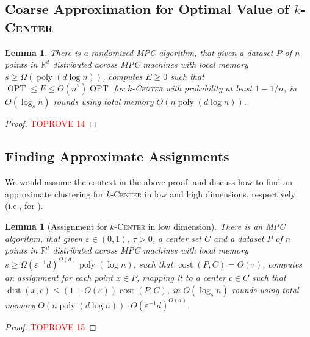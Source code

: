 \documentclass[11pt,letterpaper]{article}
\theoremstyle{plain}
\newtheorem{lemma}[theorem]{Lemma}
\theoremstyle{definition}
\theoremstyle{remark}
\newcommand{\ProblemName}[1]{\textsc{#1}}
\newcommand{\kCenter}{$k$-\ProblemName{Center}\xspace}
\DeclareMathOperator{\poly}{poly}
\DeclareMathOperator{\cost}{cost}
\DeclareMathOperator{\OPT}{OPT}
\DeclareMathOperator{\dist}{dist}
\begin{document}
\subsection{Coarse Approximation for Optimal Value of \kCenter}
\label{subsec:guess}
\begin{lemma}
    \label{lemma:guess_OPT}
    There is a randomized MPC algorithm, that given a dataset $P$ of $n$ points in $\mathbb{R}^{d}$ distributed across MPC machines with local memory $s\geq \Omega(\poly(d\log n))$,
    computes $E \geq 0$ such that $\OPT \leq E \leq O(n^7) \OPT$ for \kCenter
    with probability at least $1-1/n$,
    in $O(\log_{s} n)$ rounds using total memory $O(n \poly(d\log n))$. 
\end{lemma}

\begin{proof}\textcolor{red}{TOPROVE 14}\end{proof}





\subsection{Finding Approximate Assignments}
\label{sec:assignment}
We would assume the context in the above proof, and discuss how to find an approximate clustering for \kCenter in low and high dimensions, respectively (i.e., for ). 


\begin{lemma}[Assignment for \kCenter in low dimension]
    \label{lemma:assignment_low_dim}
    There is an MPC algorithm, that given $\varepsilon\in (0, 1)$, $\tau > 0$,
    a center set $C$ and a dataset $P$ of $n$ points in $\mathbb{R}^{d}$ distributed across MPC machines with local memory $s\geq \Omega(\varepsilon^{-1}d)^{\Omega(d)}\poly(\log n)$, such that $\cost(P, C) = \Theta(\tau)$, computes an assignment for each point $x\in P$, mapping it to a center $c\in C$ such that $\dist(x, c)\leq (1 + O(\varepsilon))\cost(P, C)$, in $O(\log_{s}n)$ rounds using total memory $O(n\poly(d\log n))\cdot O(\varepsilon^{-1}d)^{O(d)}$. 
\end{lemma}
\begin{proof}\textcolor{red}{TOPROVE 15}\end{proof}
\end{document}
